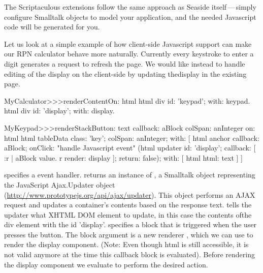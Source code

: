 \documentclass[a4paper,10pt,twoside]{book}
\begin{document}
The Scriptaculous extensions follow the same approach as Seaside itself\,---\,simply
configure Smalltalk objects to model your application, and the needed Javascript code
will be generated for you.

Let us look at a simple example of how client-side Javascript support can make our RPN
calculator behave more naturally.
Currently every keystroke to enter a digit generates a request to refresh the page.
We would like instead to handle editing of the display on the client-side by updating thedisplay in the existing page.


\begin{code}{}
MyCalculator>>>renderContentOn: html
	html div id: 'keypad'; with: keypad.
	html div id: 'display'; with: display.	
\end{code}
				

\begin{code}{}
MyKeypad>>>renderStackButton: text callback: aBlock colSpan: anInteger on: html 
	html tableData
		class: 'key';
		colSpan: anInteger;
		with: [
			html anchor
				callback: aBlock;
				onClick:				"handle Javascript event"
					(html updater
						id: 'display';
						callback: [ :r |
							aBlock value.
							r render: display ];
						return: false);
				with: [ html html: text ] ]
\end{code}

 specifies a  event handler.
 returns an instance of , a Smalltalk object representing
the JavaScript Ajax.Updater object (\url{http://www.prototypejs.org/api/ajax/updater}).
This object performs an AJAX request and updates a container's contents based on the
response text.
 tells the updater what XHTML DOM element to update, in this case the contents ofthe div element with the id 'display'.
 specifies a block that is triggered when the user presses the button.
The block argument is a new renderer , which we can use to render the display
component.
(Note: Even though html is still accessible, it is not valid anymore at the time this
callback block is evaluated).
Before rendering the display component we evaluate  to perform the desired
action.
\end{document}
